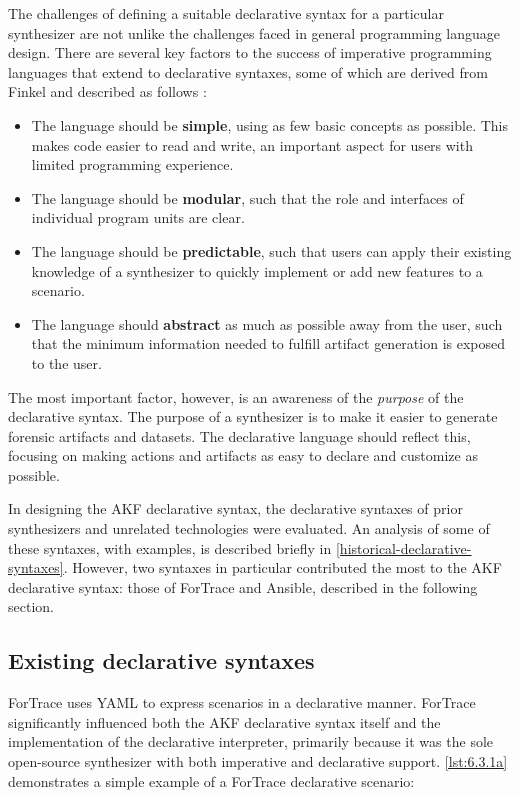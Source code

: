 \documentclass[letterpaper,12pt]{report}
\def\tightlist{}
\begin{document}
The challenges of defining a suitable declarative syntax for a
particular synthesizer are not unlike the challenges faced in general
programming language design. There are several key factors to the
success of imperative programming languages that extend to declarative
syntaxes, some of which are derived from Finkel and described as follows
\cite{finkel1996advanced}:

\begin{itemize}
\tightlist
\item
  The language should be \textbf{simple}, using as few basic concepts as
  possible. This makes code easier to read and write, an important
  aspect for users with limited programming experience.
\item
  The language should be \textbf{modular}, such that the role and
  interfaces of individual program units are clear.
\item
  The language should be \textbf{predictable}, such that users can apply
  their existing knowledge of a synthesizer to quickly implement or add
  new features to a scenario.
\item
  The language should \textbf{abstract} as much as possible away from
  the user, such that the minimum information needed to fulfill artifact
  generation is exposed to the user.
\end{itemize}

The most important factor, however, is an awareness of the
\emph{purpose} of the declarative syntax. The purpose of a synthesizer
is to make it easier to generate forensic artifacts and datasets. The
declarative language should reflect this, focusing on making actions and
artifacts as easy to declare and customize as possible.

In designing the AKF declarative syntax, the declarative syntaxes of
prior synthesizers and unrelated technologies were evaluated. An
analysis of some of these syntaxes, with examples, is described briefly
in \autoref{historical-declarative-syntaxes}.
However, two syntaxes in particular contributed the most to the AKF
declarative syntax: those of ForTrace and Ansible, described in the
following section.

\subsection{Existing declarative
syntaxes}\label{existing-declarative-syntaxes}

ForTrace \cite{gobelForTraceHolisticForensic2022} uses YAML to
express scenarios in a declarative manner. ForTrace significantly
influenced both the AKF declarative syntax itself and the implementation
of the declarative interpreter, primarily because it was the sole
open-source synthesizer with both imperative and declarative support.
\autoref{lst:6.3.1a} demonstrates a simple example of a ForTrace
declarative scenario:
\end{document}
